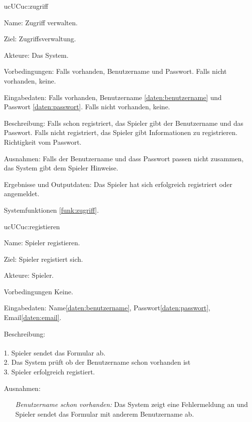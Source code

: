 \begin{description}[leftmargin=5em, style=sameline]

	\begin{lhp}{uc}{UC}{uc:zugriff}
		\item [Name:] Zugriff verwalten.
		\item [Ziel:] Zugriffsverwaltung.
		\item [Akteure:] Das System.
		\item [Vorbedingungen:] Falls vorhanden, Benutzername und Passwort. Falls nicht vorhanden, keine.
		\item [Eingabedaten:] Falls vorhanden, Benutzername \ref{daten:benutzername} und Passwort \ref{daten:passwort}. Falls nicht vorhanden, keine.
		\item [Beschreibung:] Falls schon registriert, das Spieler gibt der Benutzername und das Passwort. Falls nicht registriert, das Spieler gibt Informationen zu registrieren.  Richtigkeit vom Passwort.
		\item [Ausnahmen:] Falls der Benutzername und dass Passwort passen nicht zusammen, das System gibt dem Spieler Hinweise.
		\item [Ergebnisse und Outputdaten:] Das Spieler hat sich erfolgreich registriert oder angemeldet.
		\item [Systemfunktionen] \ref{funk:zugriff}.
	\end{lhp}

	\begin{lhp}{uc}{UC}{uc:registieren}
	    \item [Name:] Spieler registieren.
	    \item [Ziel:] Spieler registiert sich.
	    \item [Akteure:] Spieler.
	    \item [Vorbedingungen] Keine.
        \item [Eingabedaten:] Name\ref{daten:benutzername}, Passwort\ref{daten:passwort}, Email\ref{daten:email}. 
	\item [Beschreibung:] \hfill\\ \hfill\\
	1. Spieler sendet das Formular ab.\\
	2. Das System prüft ob der Benutzername schon vorhanden ist\\	
	3. Spieler erfolgreich registiert.\\			
	\item [Ausnahmen:]\hfill 
	\begin{itemize} 
		\item[] \textit{Benutzername schon vorhanden:} Das System zeigt eine Fehlermeldung an und Spieler sendet das Formular mit anderem Benutzername ab.					
		

\end{itemize}
\end{lhp}
\end{description}
